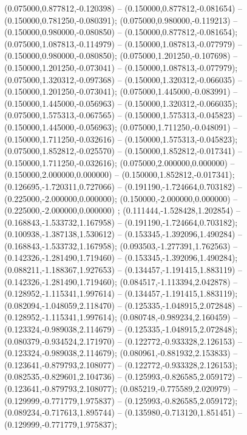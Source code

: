  (0.075000,0.877812,-0.120398) -- (0.150000,0.877812,-0.081654) -- (0.150000,0.781250,-0.080391);
 (0.075000,0.980000,-0.119213) -- (0.150000,0.980000,-0.080850) -- (0.150000,0.877812,-0.081654);
 (0.075000,1.087813,-0.114979) -- (0.150000,1.087813,-0.077979) -- (0.150000,0.980000,-0.080850);
 (0.075000,1.201250,-0.107698) -- (0.150000,1.201250,-0.073041) -- (0.150000,1.087813,-0.077979);
 (0.075000,1.320312,-0.097368) -- (0.150000,1.320312,-0.066035) -- (0.150000,1.201250,-0.073041);
 (0.075000,1.445000,-0.083991) -- (0.150000,1.445000,-0.056963) -- (0.150000,1.320312,-0.066035);
 (0.075000,1.575313,-0.067565) -- (0.150000,1.575313,-0.045823) -- (0.150000,1.445000,-0.056963);
 (0.075000,1.711250,-0.048091) -- (0.150000,1.711250,-0.032616) -- (0.150000,1.575313,-0.045823);
 (0.075000,1.852812,-0.025570) -- (0.150000,1.852812,-0.017341) -- (0.150000,1.711250,-0.032616);
 (0.075000,2.000000,0.000000) -- (0.150000,2.000000,0.000000) -- (0.150000,1.852812,-0.017341);
 (0.126695,-1.720311,0.727066) -- (0.191190,-1.724664,0.703182) -- (0.225000,-2.000000,0.000000);
 (0.150000,-2.000000,0.000000) -- (0.225000,-2.000000,0.000000) ;
 (0.111444,-1.528428,1.202854) -- (0.168843,-1.533732,1.167958) -- (0.191190,-1.724664,0.703182);
 (0.100938,-1.387138,1.530612) -- (0.153345,-1.392096,1.490284) -- (0.168843,-1.533732,1.167958);
 (0.093503,-1.277391,1.762563) -- (0.142326,-1.281490,1.719460) -- (0.153345,-1.392096,1.490284);
 (0.088211,-1.188367,1.927653) -- (0.134457,-1.191415,1.883119) -- (0.142326,-1.281490,1.719460);
 (0.084517,-1.113394,2.042878) -- (0.128952,-1.115341,1.997614) -- (0.134457,-1.191415,1.883119);
 (0.082094,-1.048059,2.118470) -- (0.125335,-1.048915,2.072848) -- (0.128952,-1.115341,1.997614);
 (0.080748,-0.989234,2.160459) -- (0.123324,-0.989038,2.114679) -- (0.125335,-1.048915,2.072848);
 (0.080379,-0.934524,2.171970) -- (0.122772,-0.933328,2.126153) -- (0.123324,-0.989038,2.114679);
 (0.080961,-0.881932,2.153833) -- (0.123641,-0.879793,2.108077) -- (0.122772,-0.933328,2.126153);
 (0.082535,-0.829601,2.104736) -- (0.125993,-0.826585,2.059172) -- (0.123641,-0.879793,2.108077);
 (0.085219,-0.775589,2.020979) -- (0.129999,-0.771779,1.975837) -- (0.125993,-0.826585,2.059172);
 (0.089234,-0.717613,1.895744) -- (0.135980,-0.713120,1.851451) -- (0.129999,-0.771779,1.975837);
